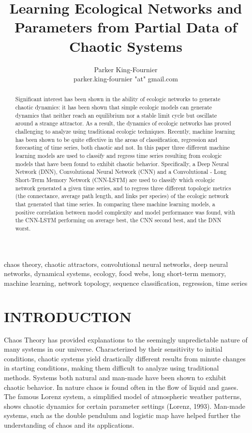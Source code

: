 \documentclass[letterpaper, 10 pt, conference]{ieeeconf}  %
\title{\LARGE \bf
Learning Ecological Networks and Parameters from Partial Data of Chaotic Systems
}
\author{Parker King-Fournier \\
		parker.king-fournier "at" gmail.com}
\begin{document}
\maketitle
\thispagestyle{empty}
\pagestyle{empty}

\begin{abstract}
Signiﬁcant interest has been shown in the ability of ecologic networks to generate chaotic dynamics: it has been shown that simple ecologic models can generate dynamics that neither reach an equilibrium nor a stable limit cycle but oscillate around a strange attractor. As a result, the dynamics of ecologic networks has proved challenging to analyze using traditional ecologic techniques. Recently, machine learning has been shown to be quite effective in the areas of classification, regression and forecasting of time series, both chaotic and not. In this paper three different machine learning models are used to classify and regress time series resulting from ecologic models that have been found to exhibit chaotic behavior. Specifically, a Deep Neural Network (DNN), Convolutional Neural Network (CNN) and a Convolutional - Long Short-Term Memory Network (CNN-LSTM) are used to classify which ecologic network generated a given time series, and to regress three different topologic metrics (the connectance, average path length, and links per species) of the ecologic network that generated that time series. In comparing these machine learning models, a positive correlation between model complexity and model performance was found, with the CNN-LSTM performing on average best, the CNN second best, and the DNN worst.
\end{abstract}
\begin{keywords}
chaos theory, chaotic attractors, convolutional neural networks, deep neural networks, dynamical systems, ecology, food webs, long short-term memory, machine learning, network topology, sequence classiﬁcation, regression, time series 
\end{keywords}


\section{INTRODUCTION}
	Chaos Theory has provided explanations to the seemingly unpredictable nature of many systems in our universe. Characterized by their sensitivity to initial conditions, chaotic systems yield drastically different results from minute changes in starting conditions, making them difficult to analyze using traditional methods. Systems both natural and man-made have been shown to exhibit chaotic behavior. In nature chaos is found often in the flow of liquid and gases. The famous Lorenz system, a simplified model of atmospheric weather patterns, shows chaotic dynamics for certain parameter settings (Lorenz, 1993). Man-made systems, such as the double pendulum and logistic map have helped further the understanding of chaos and its applications.
\end{document}
